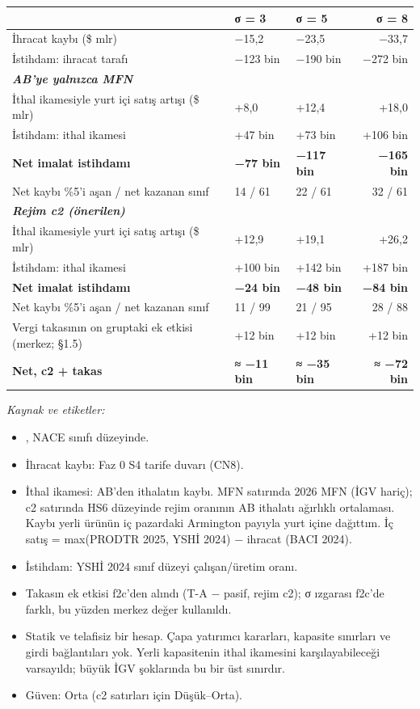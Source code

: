 \begin{longtable}[]{@{}lllr@{}}
\toprule\noalign{}
& \textbf{σ = 3} & \textbf{σ = 5} & \textbf{σ = 8} \\
\midrule\noalign{}
\endhead
\bottomrule\noalign{}
\endlastfoot
İhracat kaybı (\$ mlr) & −15,2 & −23,5 & −33,7 \\
İstihdam: ihracat tarafı & −123 bin & −190 bin & −272 bin \\
\emph{\textbf{AB'ye yalnızca MFN}} & & & \\
İthal ikamesiyle yurt içi satış artışı (\$ mlr) & +8,0 & +12,4 & +18,0 \\
İstihdam: ithal ikamesi & +47 bin & +73 bin & +106 bin \\
\textbf{Net imalat istihdamı} & \textbf{−77 bin} & \textbf{−117 bin} & \textbf{−165 bin} \\
Net kaybı \%5'i aşan / net kazanan sınıf & 14 / 61 & 22 / 61 & 32 / 61 \\
\emph{\textbf{Rejim c2 (önerilen)}} & & & \\
İthal ikamesiyle yurt içi satış artışı (\$ mlr) & +12,9 & +19,1 & +26,2 \\
İstihdam: ithal ikamesi & +100 bin & +142 bin & +187 bin \\
\textbf{Net imalat istihdamı} & \textbf{−24 bin} & \textbf{−48 bin} & \textbf{−84 bin} \\
Net kaybı \%5'i aşan / net kazanan sınıf & 11 / 99 & 21 / 95 & 28 / 88 \\
Vergi takasının on gruptaki ek etkisi (merkez; §1.5) & +12 bin & +12 bin & +12 bin \\
\textbf{Net, c2 + takas} & \textbf{≈ −11 bin} & \textbf{≈ −35 bin} & \textbf{≈ −72 bin} \\
\end{longtable}

\endgroup

\emph{Kaynak ve etiketler:}

\begin{itemize}
\tightlist
\item
  \etiketT{} , NACE sınıfı düzeyinde.
\item
  İhracat kaybı: Faz 0 S4 tarife duvarı (CN8).
\item
  İthal ikamesi: AB'den ithalatın kaybı. MFN satırında 2026 MFN (İGV hariç); c2 satırında HS6 düzeyinde rejim oranının AB ithalatı ağırlıklı ortalaması. Kaybı yerli ürünün iç pazardaki Armington payıyla yurt içine dağıttım. İç satış = max(PRODTR 2025, YSHİ 2024) − ihracat (BACI 2024).
\item
  İstihdam: YSHİ 2024 sınıf düzeyi çalışan/üretim oranı.
\item
  Takasın ek etkisi f2c'den alındı (T-A − pasif, rejim c2); σ ızgarası f2c'de farklı, bu yüzden merkez değer kullanıldı.
\item
  Statik ve telafisiz bir hesap. Çapa yatırımcı kararları, kapasite sınırları ve girdi bağlantıları yok. Yerli kapasitenin ithal ikamesini karşılayabileceği varsayıldı; büyük İGV şoklarında bu bir üst sınırdır.
\item
  Güven: Orta (c2 satırları için Düşük--Orta).
\end{itemize}

